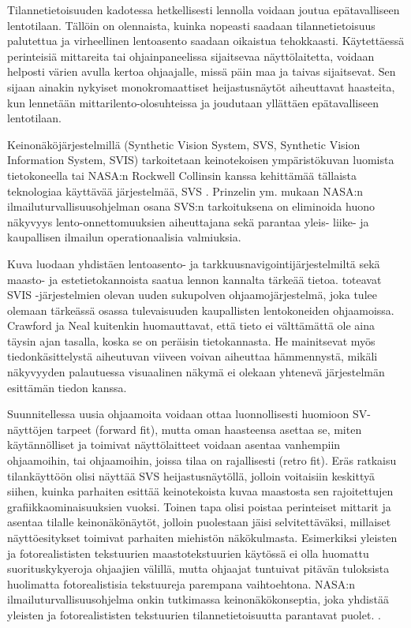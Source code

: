 \documentclass[utf8,bachelor,manualbib]{gradu3}
\begin{document}
Tilannetietoisuuden kadotessa hetkellisesti lennolla voidaan joutua epätavalliseen lentotilaan. Tällöin on olennaista, kuinka nopeasti saadaan tilannetietoisuus palutettua ja virheellinen lentoasento saadaan oikaistua tehokkaasti. Käytettäessä perinteisiä mittareita tai ohjainpaneelissa sijaitsevaa näyttölaitetta, voidaan helposti värien avulla kertoa ohjaajalle, missä päin maa ja taivas sijaitsevat. Sen sijaan ainakin nykyiset monokromaattiset heijastusnäytöt aiheuttavat haasteita, kun lennetään mittarilento-olosuhteissa ja joudutaan yllättäen epätavalliseen lentotilaan.

Keinonäköjärjestelmillä (Synthetic Vision System, SVS, Synthetic Vision Information System, SVIS) tarkoitetaan keinotekoisen ympäristökuvan luomista  tietokoneella \citep{baileyym2007} tai NASA:n Rockwell Collinsin kanssa kehittämää tällaista teknologiaa käyttävää järjestelmää, SVS \citep{crawfordneal2006}. Prinzelin ym. \citeyearpar{prinzel2004} mukaan NASA:n ilmailuturvallisuusohjelman osana SVS:n tarkoituksena on eliminoida huono näkyvyys lento-onnettomuuksien aiheuttajana sekä parantaa yleis- liike- ja kaupallisen ilmailun operationaalisia valmiuksia.

Kuva luodaan yhdistäen lentoasento- ja tarkkuusnavigointijärjestelmiltä sekä maasto- ja estetietokannoista saatua lennon kannalta tärkeää tietoa. \cite{schnellym2004} toteavat SVIS -järjestelmien olevan uuden sukupolven ohjaamojärjestelmä, joka tulee olemaan tärkeässä osassa tulevaisuuden kaupallisten lentokoneiden ohjaamoissa. Crawford ja Neal kuitenkin \citeyearpar{crawfordneal2006} huomauttavat, että tieto ei välttämättä ole aina täysin ajan tasalla, koska se on peräisin tietokannasta. He mainitsevat myös tiedonkäsittelystä aiheutuvan viiveen voivan aiheuttaa hämmennystä, mikäli näkyvyyden palautuessa visuaalinen näkymä ei olekaan yhtenevä järjestelmän esittämän tiedon kanssa.

Suunnitellessa uusia ohjaamoita voidaan ottaa luonnollisesti huomioon SV-näyttöjen tarpeet (forward fit), mutta oman haasteensa asettaa se, miten käytännölliset ja toimivat näyttölaitteet voidaan asentaa vanhempiin ohjaamoihin, tai ohjaamoihin, joissa tilaa on rajallisesti (retro fit). Eräs ratkaisu tilankäyttöön olisi näyttää SVS heijastusnäytöllä, jolloin voitaisiin keskittyä siihen, kuinka parhaiten esittää keinotekoista kuvaa maastosta sen rajoitettujen grafiikkaominaisuuksien vuoksi. Toinen tapa olisi poistaa perinteiset mittarit ja asentaa tilalle keinonäkönäytöt, jolloin puolestaan jäisi selvitettäväksi, millaiset näyttöesitykset toimivat parhaiten miehistön näkökulmasta. Esimerkiksi yleisten ja fotorealististen tekstuurien maastotekstuurien käytössä ei olla huomattu suorituskykyeroja ohjaajien välillä, mutta ohjaajat tuntuivat pitävän tuloksista huolimatta fotorealistisia tekstuureja parempana vaihtoehtona. NASA:n ilmailuturvallisuusohjelma onkin tutkimassa keinonäkökonseptia, joka yhdistää yleisten ja fotorealististen tekstuurien tilannetietoisuutta parantavat puolet. \citep{prinzel2004}.
\end{document}
